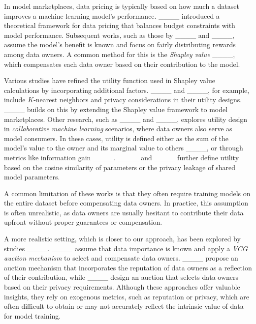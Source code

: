 In model marketplaces, data pricing is typically based on how much a dataset improves a machine learning model's performance. ____ introduced a theoretical framework for data pricing that balances budget constraints with model performance. Subsequent works, such as those by ____ and ____, assume the model's benefit is known and focus on fairly distributing rewards among data owners. A common method for this is the \emph{Shapley value} ____, which compensates each data owner based on their contribution to the model.

Various studies have refined the utility function used in Shapley value calculations by incorporating additional factors. ____ and ____, for example, include $K$-nearest neighbors and privacy considerations in their utility designs. ____ builds on this by extending the Shapley value framework to model marketplaces. Other research, such as ____ and ____, explores utility design in \emph{collaborative machine learning} scenarios, where data owners also serve as model consumers. In these cases, utility is defined either as the sum of the model's value to the owner and its marginal value to others ____, or through metrics like information gain ____. ____ and ____ further define utility based on the cosine similarity of parameters or the privacy leakage of shared model parameters.

A common limitation of these works is that they often require training models on the entire dataset before compensating data owners. In practice, this assumption is often unrealistic, as data owners are usually hesitant to contribute their data upfront without proper guarantees or compensation.


A more realistic setting, which is closer to our approach, has been explored by studies ____. ____ assume that data importance is known and apply a \emph{VCG auction mechanism} to select and compensate data owners. ____ propose an auction mechanism that incorporates the reputation of data owners as a reflection of their contribution, while ____ design an auction that selects data owners based on their privacy requirements. Although these approaches offer valuable insights, they rely on exogenous metrics, such as reputation or privacy, which are often difficult to obtain or may not accurately reflect the intrinsic value of data for model training.

